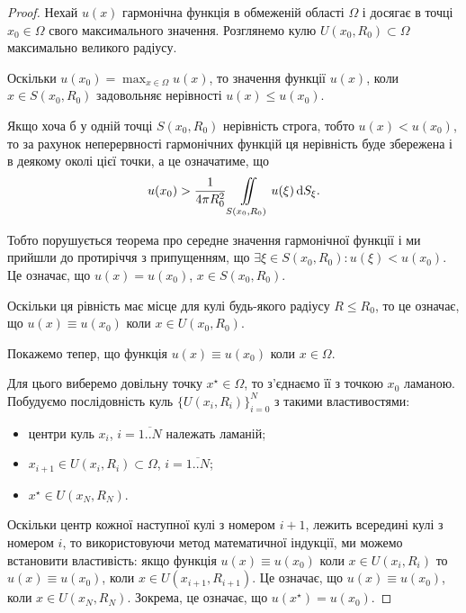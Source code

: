 \begin{proof}
	Нехай $u(x)$ гармонічна функція в обмеженій області $\Omega$ і досягає в точці $x_0 \in \Omega$ свого максимального значення. Розглянемо кулю $U(x_0, R_0) \subset \Omega$ максимально великого радіусу. \medskip

	Оскільки $u(x_0) = \max_{x \in \Omega} u(x)$, то значення функції $u(x)$, коли $x \in S(x_0, R_0)$ задовольняє нерівності $u(x) \le u(x_0)$. \medskip

	Якщо хоча б у одній точці $S(x_0, R_0)$ нерівність строга, тобто $u(x) < u(x_0)$, то за рахунок неперервності гармонічних функцій ця нерівність буде збережена і в деякому околі цієї точки, а це означатиме, що
	\begin{equation}
		u(x_0) > \frac{1}{4 \pi R_0^2} \displaystyle\iint\limits_{S(x_0,R_0)} u(\xi) \mathop{}\!\mathrm{d} S_\xi.
	\end{equation}

	Тобто порушується теорема про середне значення гармонічної функції і ми прийшли до протиріччя з припущенням, що $\exists \xi \in S(x_0, R_0): u(\xi) < u(x_0)$. Це означає, що $u(x) = u(x_0)$, $x \in S(x_0, R_0)$. \medskip

	Оскільки ця рівність має місце для кулі будь-якого радіусу $R \le R_0$, то це означає, що $u(x) \equiv u(x_0)$  коли $x \in U(x_0, R_0)$. \medskip

	Покажемо тепер, що функція $u(x) \equiv u(x_0)$  коли $x \in \Omega$. \medskip

	Для цього виберемо довільну точку $x^\star \in \Omega$, то з'єднаємо її з точкою $x_0$ ламаною. Побудуємо послідовність куль $\{U(x_i, R_i)\}_{i=0}^N$ з такими властивостями: 
	\begin{itemize}
		\item центри куль $x_i$, $i = \overline{1..N}$ належать ламаній;
		\item $x_{i + 1} \in U(x_i, R_i) \subset \Omega$, $i = \overline{1..N}$;
		\item $x^\star \in U(x_N, R_N)$.
	\end{itemize}

	Оскільки центр кожної наступної кулі з номером $i + 1$, лежить всередині кулі з номером $i$, то використовуючи метод математичної індукції, ми можемо встановити властивість: якщо функція $u(x) \equiv u(x_0)$ коли $x \in U(x_i, R_i)$ то $u(x) \equiv u(x_0)$, коли $x \in U(x_{i+1}, R_{i+1})$. Це означає, що $u(x) \equiv u(x_0)$, коли $x \in U(x_N, R_N)$. Зокрема, це означає, що $u(x^\star) = u(x_0)$.
\end{proof}


